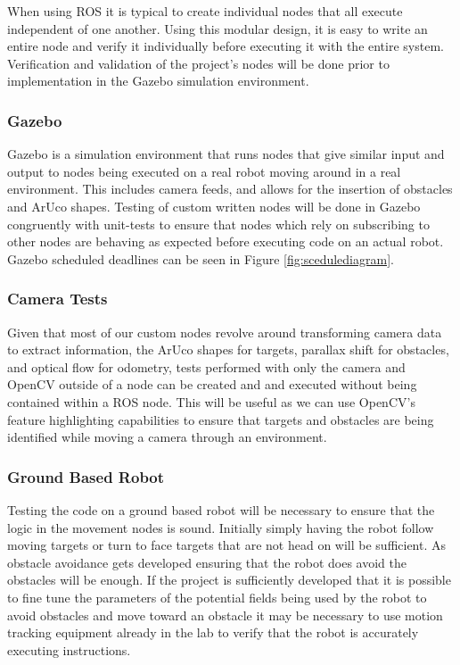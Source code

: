 \documentclass{article}
\begin{document}
	When using ROS it is typical to create individual nodes that all execute independent of one another. Using this modular design, it is easy to write an entire node and verify it individually before executing it with the entire system.	Verification and validation of the project's nodes will be done prior to implementation in the Gazebo simulation environment.
	
	\subsubsection{Gazebo}
	
	Gazebo is a simulation environment that runs nodes that give similar input and output to nodes being executed on a real robot moving around in a real environment. This includes camera feeds, and allows for the insertion of obstacles and ArUco shapes. Testing of custom written nodes will be done in Gazebo congruently with unit-tests to ensure that nodes which rely on subscribing to other nodes are behaving as expected before executing code on an actual robot. Gazebo scheduled deadlines can be seen in Figure \ref{fig:scedulediagram}.
	
	\subsubsection{Camera Tests}
	
	Given that most of our custom nodes revolve around transforming camera data to extract information, the ArUco shapes for targets, parallax shift for obstacles, and optical flow for odometry, tests performed with only the camera and OpenCV outside of a node can be created and and executed without being contained within a ROS node. This will be useful as we can use OpenCV's feature highlighting capabilities to ensure that targets and obstacles are being identified while moving a camera through an environment. 
	
	\subsubsection{Ground Based Robot}
	
	Testing the code on a ground based robot will be necessary to ensure that the logic in the movement nodes is sound. Initially simply having the robot follow moving targets or turn to face targets that are not head on will be sufficient. As obstacle avoidance gets developed ensuring that the robot does avoid the obstacles will be enough. If the project is sufficiently developed that it is possible to fine tune the parameters of the potential fields being used by the robot to avoid obstacles and move toward an obstacle it may be necessary to use motion tracking equipment already in the lab to verify that the robot is accurately executing instructions.
	
\end{document}
